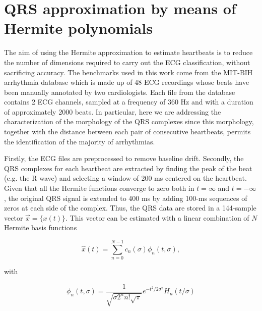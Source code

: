 \documentclass[runningheads]{llncs}
\begin{document}

\section{QRS approximation by means of Hermite polynomials}\label{s:arr}

The aim of using the Hermite approximation to estimate heartbeats is to 
reduce the number of dimensions required to carry out the ECG classification, 
without sacrificing accuracy. 
The benchmarks used in this work come from the MIT-BIH arrhythmia database \cite{j:moody01} which is made up of 
48 ECG recordings whose beats  have been manually annotated by two cardiologists. Each file from the database 
contains 2 ECG channels, sampled at a frequency of 360 Hz and with a duration of approximately 2000 beats. 
In particular, here we are addressing the characterization of the morphology of the QRS complexes since this 
morphology, together with the distance between each pair of consecutive heartbeats, permits the identification of the majority of arrhythmias.

Firstly,  the ECG files are preprocessed to remove baseline drift. Secondly, the QRS complexes for each heartbeat are extracted by finding the peak of the beat (e.g. the R wave) and selecting a  window of 200 ms centered on the heartbeat. Given that all the Hermite functions converge to zero both in $t=\infty$ and $t=-\infty$, the original QRS signal is extended to 400 ms by adding 100-ms sequences of zeros at each side of the complex. Thus, the QRS data are stored in a 144-sample vector $\vec{x}=\{x(t)\}$. This vector can be estimated with a linear combination of $N$ Hermite basis functions

\begin{equation}\label{eqn:hat}
\hat{x}(t)=\sum_{n=0}^{N-1}c_n(\sigma )\phi_n(t,\sigma),
\end{equation}

\noindent with

\begin{equation}\label{eqn:phi}
\phi_n(t,\sigma )=\frac{1}{\sqrt{\sigma 2^n n!\sqrt{\pi}}}e^{-t^2/2\sigma^2}H_n(t/\sigma) 
\end{equation}
\end{document}
